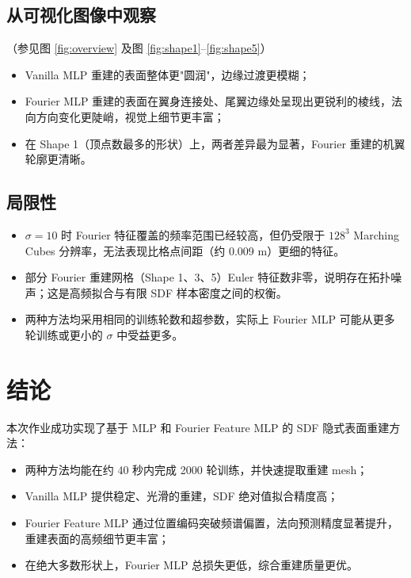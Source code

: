 \documentclass[12pt, a4paper]{article}
\begin{document}
\subsection{从可视化图像中观察}

（参见图 \ref{fig:overview} 及图 \ref{fig:shape1}--\ref{fig:shape5}）

\begin{itemize}
  \item Vanilla MLP 重建的表面整体更"圆润"，边缘过渡更模糊；
  \item Fourier MLP 重建的表面在翼身连接处、尾翼边缘处呈现出更锐利的棱线，法向方向变化更陡峭，视觉上细节更丰富；
  \item 在 Shape 1（顶点数最多的形状）上，两者差异最为显著，Fourier 重建的机翼轮廓更清晰。
\end{itemize}

\subsection{局限性}

\begin{itemize}
  \item $\sigma = 10$ 时 Fourier 特征覆盖的频率范围已经较高，但仍受限于 $128^3$ Marching Cubes 分辨率，无法表现比格点间距（约 0.009 m）更细的特征。
  \item 部分 Fourier 重建网格（Shape 1、3、5）Euler 特征数非零，说明存在拓扑噪声；这是高频拟合与有限 SDF 样本密度之间的权衡。
  \item 两种方法均采用相同的训练轮数和超参数，实际上 Fourier MLP 可能从更多轮训练或更小的 $\sigma$ 中受益更多。
\end{itemize}

\section{结论}

本次作业成功实现了基于 MLP 和 Fourier Feature MLP 的 SDF 隐式表面重建方法：

\begin{itemize}
  \item 两种方法均能在约 40 秒内完成 2000 轮训练，并快速提取重建 mesh；
  \item Vanilla MLP 提供稳定、光滑的重建，SDF 绝对值拟合精度高；
  \item Fourier Feature MLP 通过位置编码突破频谱偏置，法向预测精度显著提升，重建表面的高频细节更丰富；
  \item 在绝大多数形状上，Fourier MLP 总损失更低，综合重建质量更优。
\end{itemize}
\end{document}
